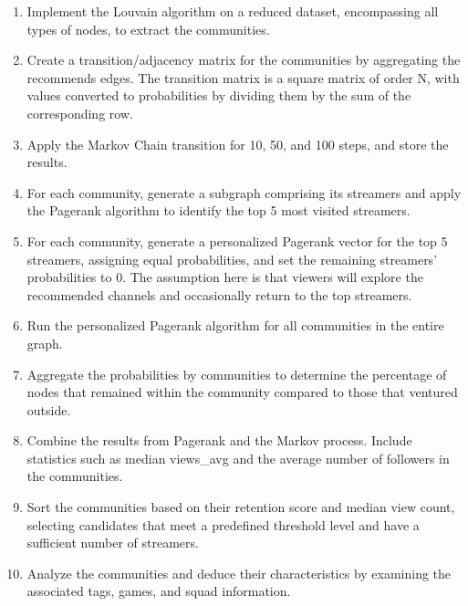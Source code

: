 \documentclass[11pt, oneside]{article}   	%
\begin{document}
\begin{enumerate}
    \item Implement the Louvain algorithm on a reduced dataset, encompassing all types of nodes, to extract the communities.
    \item Create a transition/adjacency matrix for the communities by aggregating the recommends edges. The transition matrix is a square matrix of order N, with values converted to probabilities by dividing them by the sum of the corresponding row.
    \item Apply the Markov Chain transition for 10, 50, and 100 steps, and store the results.
    \item For each community, generate a subgraph comprising its streamers and apply the Pagerank algorithm to identify the top 5 most visited streamers. 
    \item For each community, generate a personalized Pagerank vector for the top 5 streamers, assigning equal probabilities, and set the remaining streamers' probabilities to 0. The assumption here is that viewers will explore the recommended channels and occasionally return to the top streamers.
    \item Run the personalized Pagerank algorithm for all communities in the entire graph.
    \item Aggregate the probabilities by communities to determine the percentage of nodes that remained within the community compared to those that ventured outside.
    \item Combine the results from Pagerank and the Markov process. Include statistics such as median views\_avg and the average number of followers in the communities.
    \item Sort the communities based on their retention score and median view count, selecting candidates that meet a predefined threshold level and have a sufficient number of streamers.
    \item Analyze the communities and deduce their characteristics by examining the associated tags, games, and squad information.
\end{enumerate}
\end{document}
